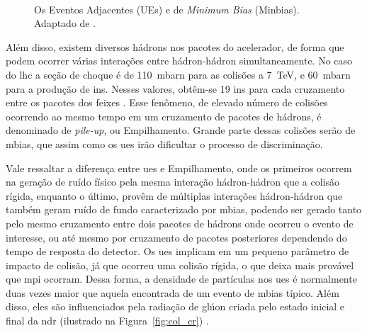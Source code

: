 \begin{figure}[ht!]
    \label{fig:minbxue}
    \begin{center}
%
        \\ 
    \end{center}
    \caption[Os Eventos Adjacentes (UEs) e de \emph{Minimum Bias} (Minbias)]{%
       Os Eventos Adjacentes (UEs) e de \emph{Minimum Bias} (Minbias). 
Adaptado de \cite{rick_field_slides}.
     }%
\end{figure}

Além disso, existem diversos hádrons nos pacotes do acelerador, de forma que podem
ocorrer várias interações entre hádron-hádron simultaneamente. No caso do \gls{lhc} 
a seção de choque é de 110~mbarn para as colisões a 7~TeV, e
60~mbarn para a produção de \glspl{in}.
Nesses valores, obtêm-se 19 \glspl{in} para cada
cruzamento entre os pacotes dos feixes \cite{webLHC,ATLAS_TDR}. Esse fenômeno, de elevado número de
colisões ocorrendo ao mesmo tempo em um cruzamento de pacotes de hádrons, é
denominado de \emph{pile-up}, ou Empilhamento. Grande parte dessas colisões 
serão de \gls{mbias}, que assim como os \glspl{ue} irão
dificultar o processo de discriminação.

Vale ressaltar a diferença entre \glspl{ue}
e Empilhamento, onde os primeiros ocorrem na geração de ruído físico
pela mesma interação hádron-hádron que a colisão rígida, enquanto o
último, provêm de múltiplas interações hádron-hádron que também geram ruído de
fundo caracterizado por \gls{mbias}, podendo ser gerado tanto pelo mesmo cruzamento 
entre dois pacotes de hádrons onde ocorreu o evento de interesse, 
ou até mesmo por cruzamento de pacotes 
posteriores dependendo do tempo de resposta do detector. 
Os \glspl{ue} implicam em um pequeno parâmetro de
impacto de colisão, já que ocorreu uma colisão rígida, o que deixa mais 
provável que \gls{mpi} ocorram.
Dessa forma, a densidade de partículas nos \glspl{ue} é normalmente duas vezes
maior que aquela encontrada de um evento de \gls{mbias} típico.
Além disso, eles são influenciados pela
radiação de glúon criada pelo estado inicial e final da \gls{ndr} (ilustrado na
Figura~\ref{fig:col_cr})
\cite{Underlying}. 

